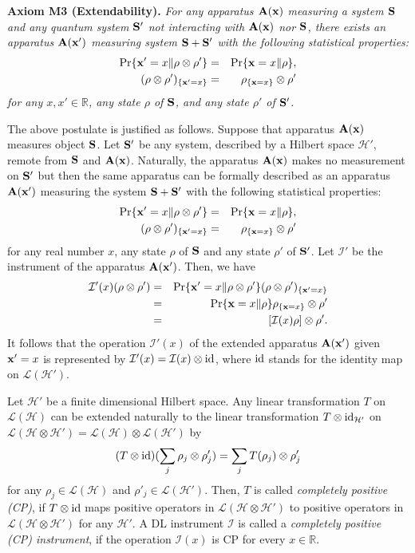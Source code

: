 \documentclass[graybox]{svmult}
\newcommand{\beq}{\begin{equation}}
\newcommand{\eeq}{\end{equation}}
\newcommand{\beqa}{\begin{eqnarray}}
\newcommand{\eeqa}{\end{eqnarray}}
\newcommand{\bA}{{\bf A}}
\newcommand{\bS}{{\bf S}}
\newcommand{\cH}{{\mathcal H}}
\newcommand{\cI}{{\mathcal I}}
\newcommand{\cL}{{\mathcal L}}
\newcommand{\nn}{\nonumber}
\newcommand{\rh}{\rho}
\newcommand{\tc}{\cL}
\newcommand{\bx}{{\bf x}}
\newcommand{\R}{\mathbb{R}}
\newcommand{\id}{{\rm id}}
\begin{document}
{\bf Axiom M3 (Extendability).}
{\em For any apparatus $\bA(\bx)$ measuring a system $\bS$
and any quantum system $\bS'$ not interacting with $\bA(\bx)$ 
nor $\bS$,  there exists an apparatus $\bA(\bx')$ measuring system
$\bS+\bS'$  with the following statistical properties:
\beqa\label{eq:ex-1}
\Pr\{\bx'=x\|\rh\otimes\rh'\}
&=&
\Pr\{\bx=x\|\rh\},\\
(\rh\otimes\rh')_{\{\bx'=x\}}&=&\rh_{\{\bx=x\}}\otimes
\rh'
\label{eq:ex-2}
\eeqa
for any $x,x'\in \R$, any state $\rh$ of $\bS$, 
and any state $\rh'$ of $\bS'$.}
\bigskip



The above postulate is justified as follows.
Suppose that apparatus $\bA(\bx)$ measures object $\bS$.
Let $\bS'$ be any system, described by a Hilbert space $\cH'$, 
remote from $\bS$ and
$\bA(\bx)$.
Naturally, the apparatus $\bA(\bx)$ makes no measurement on $\bS'$
but then the same apparatus can be formally described 
as an apparatus $\bA(\bx')$ measuring 
the system $\bS+\bS'$ with the following statistical properties:
\beqa
\Pr\{\bx'=x\|\rh\otimes\rh'\}
&=&
\Pr\{\bx=x\|\rh\},\\
(\rh\otimes\rh')_{\{\bx'=x\}}&=&\rh_{\{\bx=x\}}\otimes
\rh'
\eeqa
for any real number $x$, any state $\rh$ of $\bS$ and any state $\rh'$ of
$\bS'$. 
Let $\cI'$ be the instrument of the apparatus $\bA(\bx')$.
Then, we have
\beqa
\cI'(x)(\rh\otimes\rh')
&=&\Pr\{\bx'=x\|\rh\otimes\rh'\}(\rh\otimes\rh')_{\{\bx'=x\}}\nn\\
&=&\Pr\{\bx=x\|\rh\}\rh_{\{\bx=x\}}\otimes\rh'\nn\\
&=&[\cI(x)\rh]\otimes \rh'.
\eeqa
It follows that the operation $\cI'(x)$ of the extended apparatus
$\bA(\bx')$ given  $\bx'=x$ is represented by  
$\cI'(x)=\cI(x)\otimes \id $, where $\id$ stands for the identity map on $\cL(\cH')$.

Let $\cH'$ be a finite dimensional Hilbert space.
Any linear transformation $T$ on $\tc(\cH)$
can be extended naturally to the linear transformation $T\otimes {\rm id}_{\cH'}$
on  $\tc(\cH\otimes\cH')=\tc(\cH)\otimes\cL(\cH')$
by
\beq
(T\otimes \id)(\sum_{j}\rh_{j}\otimes \rh'_{j})
=\sum_{j}T(\rh_{j})\otimes\rh'_{j}
\eeq
for any $\rh_{j}\in\cL(\cH)$ and $\rh'_{j}\in\tc(\cH')$.
Then, $T$ is called 
{\em completely positive (CP)}, if $T\otimes \id$ maps
positive operators in $\cL(\cH\otimes\cH')$ to positive
operators in  $\cL(\cH\otimes\cH')$ for any $\cH'$.
A DL instrument $\cI$ is called a {\em completely positive (CP) instrument},
if the operation $\cI(x)$ is CP for every $x\in\R$.
\end{document}
